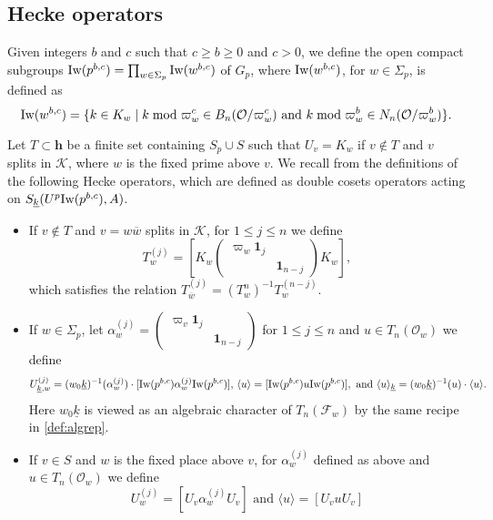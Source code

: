 \documentclass[leqno]{amsart}
\theoremstyle{definition}
\theoremstyle{remark}
\newcommand{\smat}[1]{\left(\begin{smallmatrix} #1 \end{smallmatrix}\right)}
\newcommand{\id}{\mathbf{1}}
\newcommand{\oo}{\mathcal{O}}
\newcommand{\finite}{\mathbf{h}}
\newcommand{\F}{{\mathcal{F}}} %
\newcommand{\K}{{\mathcal{K}}} %
\newcommand{\bw}{\overline{w}}
\newcommand{\wt}[1]{\underline{ #1 }}
\newcommand{\Iw}{\textnormal{Iw}} %
\begin{document}
\subsection{Hecke operators}

Given integers $b$ and $c$
such that $c\geq b\geq 0$ and $c>0$,
we define the open compact subgroups
$\Iw(p^{b,c})=\prod_{w\in \Sigma_p}\Iw(w^{b,c})$ of $G_p$, where 
$\Iw(w^{b,c})$, for $w\in \Sigma_p$, is defined as
\begin{equation}\label{def:Iwahori}
	\Iw(w^{b,c})=\{
	k\in K_w\mid 
    k \bmod \varpi_w^c \in B_n(\oo/\varpi_w^c)
	\text{ and }
	k \bmod \varpi_w^b \in N_n(\oo/\varpi_w^b)
	\}.
\end{equation}

Let $T\subset\finite$ be a finite set containing $S_p\cup S$
such that $U_v=K_w$ if $v\notin T$ and $v$ splits in $\K$,
where $w$ is the fixed prime above $v$.
We recall from \cite{ger} 
the definitions of the following Hecke operators,
which are defined as double cosets operators
acting on $S_{\wt{k}}(U^p\Iw(p^{b,c}),A)$.
\begin{itemize}

\item 
If $v\notin T$ and $v=w\bw$ splits in $\K$,
for $1\leq j\leq n$ we define 
\begin{equation}\label{def:hecke_away_p}
	T_w^{(j)}=
	\left[
	K_w
	\begin{pmatrix}
		\varpi_w\id_{j}&\\&\id_{n-j}
	\end{pmatrix}
	K_w
	\right],
\end{equation}
which satisfies the relation
$T_{\bw}^{(j)}=(T_{w}^{{n}})^{-1}T_w^{(n-j)}$.

\item
If $w\in \Sigma_p$, let  
$\alpha_w^{(j)}=
\smat{ \varpi_v\id_{j}&\\&\id_{n-j} } $
for $1\leq j\leq n$
and $u\in T_n(\oo_w)$ we define
\begin{equation}\label{def:hecke_at_p}
	U_{\wt{k},w}^{(j)}=
	(w_0\wt{k})^{-1}(\alpha_{w}^{(j)})\cdot
	[\Iw(p^{b,c})\alpha_w^{(j)}\Iw(p^{b,c})],\,
	\langle u\rangle=
	[\Iw(p^{b,c})u\Iw(p^{b,c})],
	\text{ and }
	\langle u\rangle_{\wt{k}}= (w_0\wt{k})^{-1}(u)\cdot \langle u\rangle.
\end{equation}
Here $w_0\wt{k}$ is viewed as an algebraic character of $T_n(\F_w)$ 
by the same recipe in \eqref{def:algrep}.

\item 
If $v\in S$ and $w$ is the fixed place above $v$,
for $\alpha_w^{(j)}$ defined as above
and $u\in T_n(\oo_w)$ we define 
\begin{equation}\label{def:hecke_at_s}
	U_{w}^{(j)}=
	[U_v\alpha_w^{(j)}U_v]
	\text{ and }
	\langle u\rangle= 
	[U_vu U_v]
\end{equation}

\end{itemize}
\end{document}
